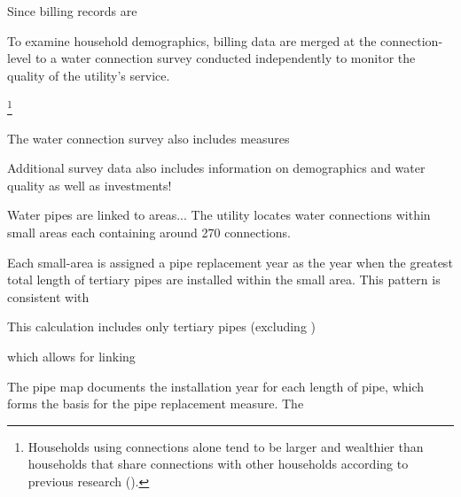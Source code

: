 \documentclass[12pt,table]{article}
\begin{document}
Since billing records are 


To examine household demographics, billing data are merged at the connection-level to a water connection survey conducted independently to monitor the quality of the utility's service.  




\footnote{Households using connections alone tend to be larger and wealthier than households that share connections with other households according to previous research (\cite{wjv}).}  



The water connection survey also includes measures 




Additional survey data also includes information on demographics and water quality as well as investments!

Water pipes are linked to areas... 
The utility locates water connections within small areas each containing around 270 connections.  

Each small-area is assigned a pipe replacement year as the year when the greatest total length of tertiary pipes are installed within the small area.   This pattern is consistent with 


  This calculation includes only tertiary pipes (excluding )

 which allows for linking 


The pipe map documents the installation year for each length of pipe, which forms the basis for the pipe replacement measure.   The 






\end{document}
